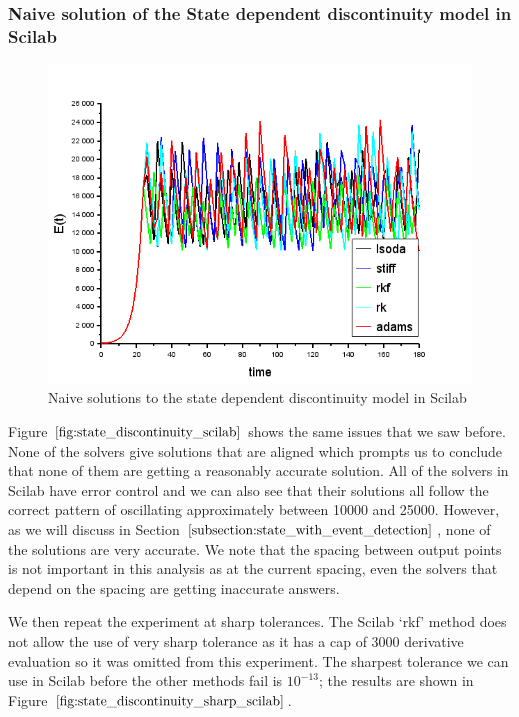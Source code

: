 \subsubsection{Naive solution of the State dependent discontinuity model in Scilab}
\begin{figure}[H]
\centering
\includegraphics[width=0.7\linewidth]{./figures/state_discontinuity_scilab}
\caption{Naive solutions to the state dependent discontinuity model in Scilab}
\label{fig:state_discontinuity_scilab}
\end{figure}

Figure $\ref{fig:state_discontinuity_scilab}$ shows the same issues that we saw before. None of the solvers give solutions that are aligned which prompts us to conclude that none of them are getting a reasonably accurate solution. All of the solvers in Scilab have error control and we can also see that their solutions all follow the correct pattern of oscillating approximately between 10000 and 25000. However, as we will discuss in Section $\ref{subsection:state_with_event_detection}$, none of the solutions are very accurate. We note that the spacing between output points is not important in this analysis as at the current spacing, even the solvers that depend on the spacing are getting inaccurate answers.

We then repeat the experiment at sharp tolerances. The Scilab `rkf' method does not allow the use of very sharp tolerance as it has a cap of 3000 derivative evaluation so it was omitted from this experiment. The sharpest tolerance we can use in Scilab before the other methods fail is $10^{-13}$; the results are shown in Figure $\ref{fig:state_discontinuity_sharp_scilab}$.

